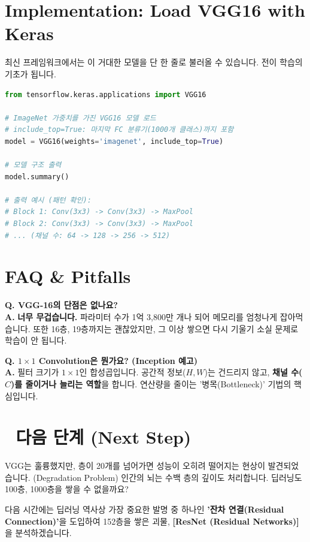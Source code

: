 \documentclass[11pt,a4paper]{book}
\theoremstyle{definition}
\begin{document}
\section{Implementation: Load VGG16 with Keras}

최신 프레임워크에서는 이 거대한 모델을 단 한 줄로 불러올 수 있습니다. 전이 학습의 기초가 됩니다.

\begin{lstlisting}[language=Python, caption=Loading VGG16, breaklines=true]
from tensorflow.keras.applications import VGG16

# ImageNet 가중치를 가진 VGG16 모델 로드
# include_top=True: 마지막 FC 분류기(1000개 클래스)까지 포함
model = VGG16(weights='imagenet', include_top=True)

# 모델 구조 출력
model.summary()

# 출력 예시 (패턴 확인):
# Block 1: Conv(3x3) -> Conv(3x3) -> MaxPool
# Block 2: Conv(3x3) -> Conv(3x3) -> MaxPool
# ... (채널 수: 64 -> 128 -> 256 -> 512)
\end{lstlisting}

\section{FAQ \& Pitfalls}

\textbf{Q. VGG-16의 단점은 없나요?} \\
\textbf{A.} \textbf{너무 무겁습니다.} 파라미터 수가 1억 3,800만 개나 되어 메모리를 엄청나게 잡아먹습니다. 또한 16층, 19층까지는 괜찮았지만, 그 이상 쌓으면 다시 기울기 소실 문제로 학습이 안 됩니다.

\textbf{Q. $1 \times 1$ Convolution은 뭔가요? (Inception 예고)} \\
\textbf{A.} 필터 크기가 $1 \times 1$인 합성곱입니다. 공간적 정보($H, W$)는 건드리지 않고, \textbf{채널 수($C$)를 줄이거나 늘리는 역할}을 합니다. 연산량을 줄이는 '병목(Bottleneck)' 기법의 핵심입니다.

\section*{🔗 다음 단계 (Next Step)}
VGG는 훌륭했지만, 층이 20개를 넘어가면 성능이 오히려 떨어지는 현상이 발견되었습니다. (Degradation Problem)
인간의 뇌는 수백 층의 깊이도 처리합니다. 딥러닝도 100층, 1000층을 쌓을 수 없을까요?

다음 시간에는 딥러닝 역사상 가장 중요한 발명 중 하나인 \textbf{'잔차 연결(Residual Connection)'}을 도입하여 152층을 쌓은 괴물, \textbf{[ResNet (Residual Networks)]}을 분석하겠습니다.
\end{document}
